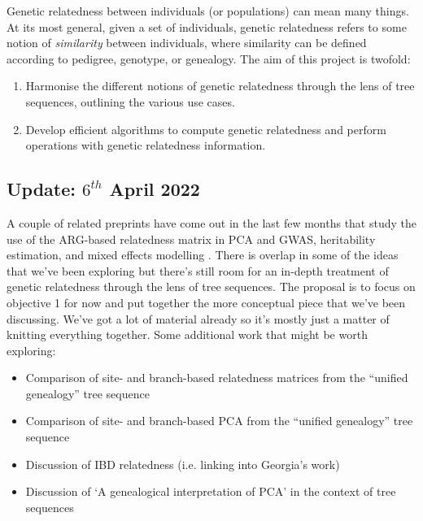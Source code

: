 Genetic relatedness between individuals (or populations) can mean many things.
%
At its most general, given a set of individuals, genetic relatedness refers
to some notion of \textit{similarity} between individuals, where similarity
can be defined according to pedigree, genotype, or genealogy.
%
The aim of this project is twofold:

\begin{enumerate}
    \item Harmonise the different notions of genetic relatedness through the
    lens of tree sequences, outlining the various use cases.
    \item Develop efficient algorithms to compute genetic relatedness and perform
    operations with genetic relatedness information.
\end{enumerate}

\subsection*{Update: $6^{th}$ April 2022}

A couple of related preprints have come out in the last few months that study
the use of the ARG-based relatedness matrix in PCA \citep{fan2022genealogical}
and GWAS, heritability estimation, and mixed effects modelling \citep{zhang2023biobank}.
%
There is overlap in some of the ideas that we've been exploring but there's still
room for an in-depth treatment of genetic relatedness through the lens of tree sequences.
%
The proposal is to focus on objective 1 for now and put together the more
conceptual piece that we've been discussing.
%
We've got a lot of material already so it's mostly just a matter of knitting
everything together.
%
Some additional work that might be worth exploring:

\begin{itemize}
    \item Comparison of site- and branch-based relatedness matrices from the ``unified genealogy'' tree sequence
    \item Comparison of site- and branch-based PCA from the ``unified genealogy'' tree sequence
    \item Discussion of IBD relatedness (i.e. linking into Georgia's work)
    \item Discussion of `A genealogical interpretation of PCA' \citep{mcvean2009genealogical} in the context of tree sequences
\end{itemize}

\newpage

